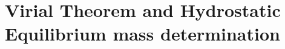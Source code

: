 \documentclass[MScProj_TLRH_ClusterEnergy.tex]{subfiles}
\begin{document}
%   
%   
%   
%   
%   






\section*{Virial Theorem and Hydrostatic Equilibrium mass determination}
\end{document}
